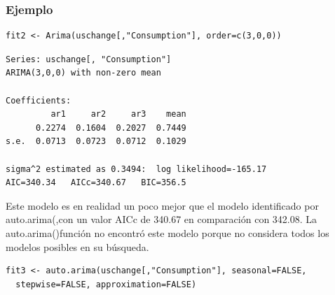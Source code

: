\documentclass[10pt]{beamer}
\begin{document}
\begin{frame}[fragile]
\frametitle{Ejemplo}



\lstset{language=r,label= ,caption= ,captionpos=b,numbers=none}
\begin{lstlisting}
fit2 <- Arima(uschange[,"Consumption"], order=c(3,0,0))
\end{lstlisting}

\pause

{\scriptsize
\begin{verbatim}
Series: uschange[, "Consumption"] 
ARIMA(3,0,0) with non-zero mean 

Coefficients:
         ar1     ar2     ar3    mean
      0.2274  0.1604  0.2027  0.7449
s.e.  0.0713  0.0723  0.0712  0.1029

sigma^2 estimated as 0.3494:  log likelihood=-165.17
AIC=340.34   AICc=340.67   BIC=356.5
\end{verbatim}
}


\small Este modelo es en realidad un poco mejor que el modelo identificado por auto.arima(,con un valor AICc de 340.67 en comparación con 342.08. La auto.arima()función no encontró este modelo porque no considera todos los modelos posibles en su búsqueda.

\pause

\lstset{language=r,label= ,caption= ,captionpos=b,numbers=none}
\begin{lstlisting}
fit3 <- auto.arima(uschange[,"Consumption"], seasonal=FALSE,
  stepwise=FALSE, approximation=FALSE)
\end{lstlisting}


\end{frame}


\end{document}
